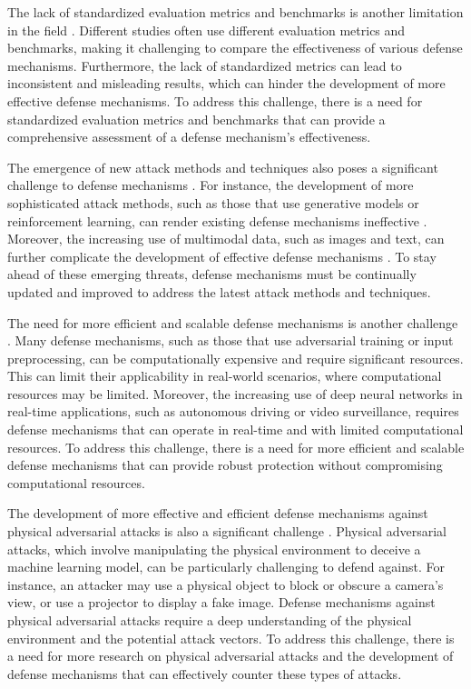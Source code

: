 \documentclass[11pt]{article}
\begin{document}
The lack of standardized evaluation metrics and benchmarks is another limitation in the field \cite{ref19}. Different studies often use different evaluation metrics and benchmarks, making it challenging to compare the effectiveness of various defense mechanisms. Furthermore, the lack of standardized metrics can lead to inconsistent and misleading results, which can hinder the development of more effective defense mechanisms. To address this challenge, there is a need for standardized evaluation metrics and benchmarks that can provide a comprehensive assessment of a defense mechanism's effectiveness.

The emergence of new attack methods and techniques also poses a significant challenge to defense mechanisms \cite{ref130}. For instance, the development of more sophisticated attack methods, such as those that use generative models or reinforcement learning, can render existing defense mechanisms ineffective \cite{ref131}. Moreover, the increasing use of multimodal data, such as images and text, can further complicate the development of effective defense mechanisms \cite{ref132}. To stay ahead of these emerging threats, defense mechanisms must be continually updated and improved to address the latest attack methods and techniques.

The need for more efficient and scalable defense mechanisms is another challenge \cite{ref133}. Many defense mechanisms, such as those that use adversarial training or input preprocessing, can be computationally expensive and require significant resources. This can limit their applicability in real-world scenarios, where computational resources may be limited. Moreover, the increasing use of deep neural networks in real-time applications, such as autonomous driving or video surveillance, requires defense mechanisms that can operate in real-time and with limited computational resources. To address this challenge, there is a need for more efficient and scalable defense mechanisms that can provide robust protection without compromising computational resources.

The development of more effective and efficient defense mechanisms against physical adversarial attacks is also a significant challenge \cite{ref7}. Physical adversarial attacks, which involve manipulating the physical environment to deceive a machine learning model, can be particularly challenging to defend against. For instance, an attacker may use a physical object to block or obscure a camera's view, or use a projector to display a fake image. Defense mechanisms against physical adversarial attacks require a deep understanding of the physical environment and the potential attack vectors. To address this challenge, there is a need for more research on physical adversarial attacks and the development of defense mechanisms that can effectively counter these types of attacks.
\end{document}
